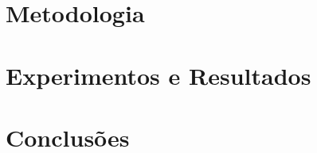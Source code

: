 \documentclass[12pt]{article}
\begin{document}
\section{Metodologia} 
\label{sec:metodology}



\section{Experimentos e Resultados}


\section{Conclusões}





\end{document}

